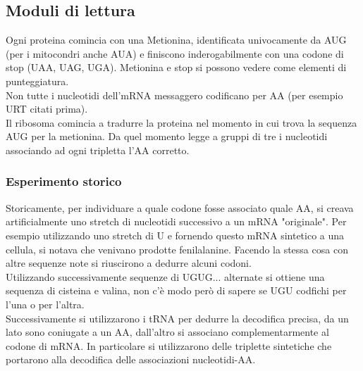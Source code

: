     \subsection{Moduli di lettura}
        Ogni proteina comincia con una Metionina, identificata univocamente da AUG (per i mitocondri anche AUA) e finiscono inderogabilmente con una codone di stop (UAA, UAG, UGA). Metionina e stop si possono vedere come elementi di punteggiatura.\\
        Non tutte i nucleotidi dell'mRNA messaggero codificano per AA (per esempio URT citati prima).\\
        Il ribosoma comincia a tradurre la proteina nel momento in cui trova la sequenza AUG per la metionina. Da quel momento legge a gruppi di tre i nucleotidi associando ad ogni tripletta l'AA corretto.
        \subsubsection{Esperimento storico}
            Storicamente, per individuare a quale codone fosse associato quale AA, si creava artificialmente uno stretch di nucleotidi successivo a un mRNA "originale". Per esempio utilizzando uno stretch di U e fornendo questo mRNA sintetico a una cellula, si notava che venivano prodotte fenilalanine. Facendo la stessa cosa con altre sequenze note si riuscirono a dedurre alcuni codoni.\\
            Utilizzando successivamente sequenze di UGUG... alternate si ottiene una sequenza di cisteina e valina, non c'è modo però di sapere se UGU codfichi per l'una o per l'altra.\\
            Successivamente si utilizzarono i tRNA per dedurre la decodifica precisa, da un lato sono coniugate a un AA, dall'altro si associano complementarmente al codone di mRNA. In particolare si utilizzarono delle triplette sintetiche che portarono alla decodifica delle associazioni nucleotidi-AA.
            
